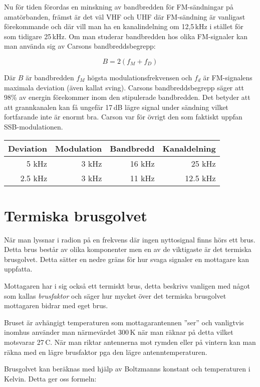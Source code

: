 Nu för tiden förordas en minskning av bandbredden för FM-sändningar på
amatörbanden, främst är det väl VHF och UHF där FM-sändning är vanligast
förekommande och där vill man ha en kanalindelning om 12,5\,kHz i stället för
som tidigare 25\,kHz. Om man studerar bandbredden hos olika FM-signaler kan
man använda sig av Carsons bandbreddsbegrepp:

\begin{equation}
	B=2(f_M+f_D)
\end{equation}

Där $B$ är bandbredden $f_M$ högsta modulationsfrekvensen och $f_d$ är
FM-signalens maximala deviation (även kallat sving). Carsons bandbreddsbegrepp
säger att 98\% av energin förekommer inom den stipulerade bandbredden. Det
betyder att att grannkanalen kan få ungefär 17\,dB lägre signal under sändning
vilket fortfarande inte är enormt bra. Carson var för övrigt den som faktiskt
uppfan SSB-modulationen.

\begin{center}
\begin{tabular}{rrrr}
Deviation & Modulation & Bandbredd & Kanaldelning\\ \hline
5 kHz & 3 kHz & 16 kHz & 25 kHz\\
2.5 kHz & 3 kHz & 11 kHz & 12.5 kHz\\
\end{tabular}
\end{center}

\section{Termiska brusgolvet}
När man lyssnar i radion på en frekvens där ingen nyttosignal finns hörs ett
brus. Detta brus består av olika komponenter men en av de viktigaste är det
termiska brusgolvet. Detta sätter en nedre gräns för hur svaga signaler en
mottagare kan uppfatta.

Mottagaren har i sig också ett termiskt brus, detta beskrivs vanligen med
något som kallas \textit{brusfaktor} och säger hur mycket över det termiska
brusgolvet mottagaren bidrar med eget brus.

Bruset är avhängigt temperaturen som mottagarantennen ''ser'' och vanligtvis
inomhus använder man närmevärdet 300\,K när man räknar på detta vilket
motsvarar 27\,\textdegree C. När man riktar antennerna mot rymden eller på
vintern kan man räkna med en lägre brusfaktor pga den lägre
antenntemperaturen.

Brusgolvet kan beräknas med hjälp av Boltzmanns konstant och temperaturen i
Kelvin. Detta ger oss formeln:

